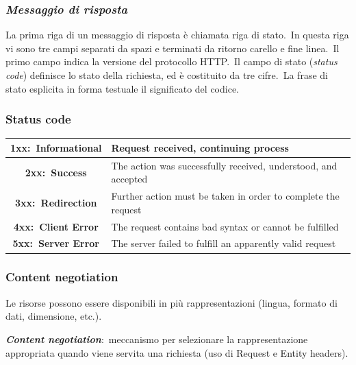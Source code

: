 \subsubsection{\emph{Messaggio di risposta}}

La prima riga di un messaggio di risposta è chiamata riga di stato.\
In questa riga vi sono tre campi separati da spazi e terminati da ritorno carello e fine linea.\
Il primo campo indica la versione del protocollo HTTP.\
Il campo di stato (\emph{status code}) definisce lo stato della richiesta, ed è costituito da tre cifre.\
La frase di stato esplicita in forma testuale il significato del codice.

\subsubsection{Status code}

\begin{center}
    \begin{tabular}{|c|m{21em}|}
        \hline
        \textbf{1xx:\ Informational} & Request received, continuing process                           \\
        \hline
        \textbf{2xx:\ Success}       & The action was successfully received, understood, and accepted \\
        \hline
        \textbf{3xx:\ Redirection}   & Further action must be taken in order to complete the request  \\
        \hline
        \textbf{4xx:\ Client Error}  & The request contains bad syntax or cannot be fulfilled         \\
        \hline
        \textbf{5xx:\ Server Error}  & The server failed to fulfill an apparently valid request       \\
        \hline
    \end{tabular}
\end{center}

\subsubsection{Content negotiation}

Le risorse possono essere disponibili in più rappresentazioni (lingua, formato di dati, dimensione, etc.).

\textbf{\emph{Content negotiation}}:\ meccanismo per selezionare la rappresentazione appropriata quando viene servita una richiesta (uso di Request e Entity headers).


